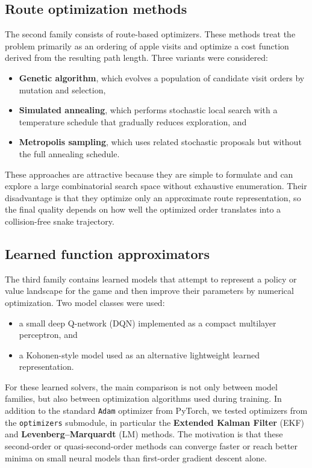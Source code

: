 \documentclass{article}
\begin{document}
\subsection{Route optimization methods}

The second family consists of route-based optimizers. These methods treat the problem primarily as an ordering of apple visits and optimize a cost function derived from the resulting path length. Three variants were considered:

\begin{itemize}
    \item \textbf{Genetic algorithm}, which evolves a population of candidate visit orders by mutation and selection,
    \item \textbf{Simulated annealing}, which performs stochastic local search with a temperature schedule that gradually reduces exploration, and
    \item \textbf{Metropolis sampling}, which uses related stochastic proposals but without the full annealing schedule.
\end{itemize}

These approaches are attractive because they are simple to formulate and can explore a large combinatorial search space without exhaustive enumeration. Their disadvantage is that they optimize only an approximate route representation, so the final quality depends on how well the optimized order translates into a collision-free snake trajectory.

\subsection{Learned function approximators}

The third family contains learned models that attempt to represent a policy or value landscape for the game and then improve their parameters by numerical optimization. Two model classes were used:

\begin{itemize}
    \item a small deep Q-network (DQN) implemented as a compact multilayer perceptron, and
    \item a Kohonen-style model used as an alternative lightweight learned representation.
\end{itemize}

For these learned solvers, the main comparison is not only between model families, but also between optimization algorithms used during training. In addition to the standard \texttt{Adam} optimizer from PyTorch, we tested optimizers from the \texttt{optimizers} submodule, in particular the \textbf{Extended Kalman Filter} (EKF) and \textbf{Levenberg--Marquardt} (LM) methods. The motivation is that these second-order or quasi-second-order methods can converge faster or reach better minima on small neural models than first-order gradient descent alone.
\end{document}
